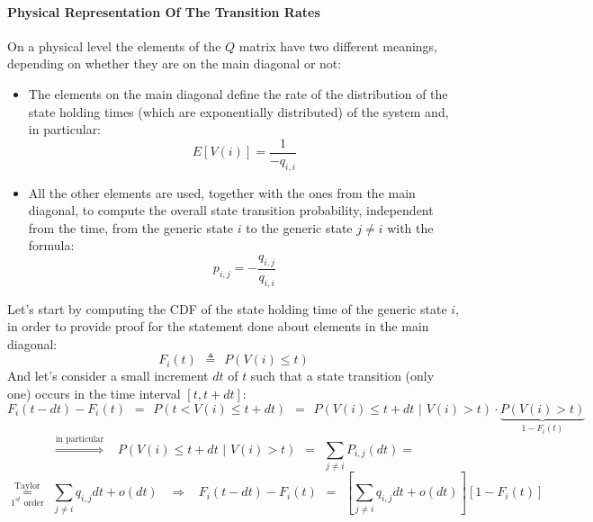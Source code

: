 \documentclass[12pt,a4paper]{article}
\begin{document}
\paragraph{Physical Representation Of The Transition Rates}
On a physical level the elements of the $Q$ matrix have two different meanings, depending on whether they are on the main diagonal or not:
\begin{itemize}
\item The elements on the main diagonal define the rate of the distribution of the state holding times (which are exponentially distributed) of the system and, in particular:
$$
E\left[V(i)\right]=\frac{1}{-q_{i,i}}
$$
\item All the other elements are used, together with the ones from the main diagonal, to compute the overall state transition probability, independent from the time, from the generic state $i$ to the generic state $j\neq i$ with the formula:
$$
p_{i,j}=-\frac{q_{i,j}}{q_{i,i}}
$$
\end{itemize}
Let's start by computing the CDF of the state holding time of the generic state $i$, in order to provide proof for the statement done about elements in the main diagonal:
$$
F_i(t)\hspace{5pt}\triangleq\hspace{5pt}
P\left( V(i)\leq t \right)
$$
And let's consider a small increment $dt$ of $t$ such that a state transition (only one) occurs in the time interval $[t,t+dt]$:
$$
F_i(t-dt)-F_i(t)\hspace{5pt}=\hspace{5pt}
P\left( t < V(i) \leq t+dt\right)\hspace{5pt}=\hspace{5pt}
P\left(V(i) \leq t+dt\hspace{4pt}|\hspace{4pt} V(i)>t \right)\cdot 
\underbrace{P\left(V(i)>t\right)}_{1-F_i(t)}
$$
$$
\overset{\textrm{in particular}}{\Rightarrow}\hspace{10pt}
P\left(V(i) \leq t+dt\hspace{4pt}|\hspace{4pt} V(i)>t \right)
\hspace{5pt}=\hspace{5pt}
\sum_{j\neq i}{P_{i,j}(dt)}
=
$$
$$
\overset{\textrm{Taylor}}{\underset{1^{st}\textrm{ order}}{=}}
\hspace{5pt}
\sum_{j\neq i}{q_{i,j}dt+o(dt)}
\hspace{10pt}
\Rightarrow
\hspace{10pt}
F_i(t-dt)-F_i(t)
\hspace{5pt}=\hspace{5pt}
\left[
\sum_{j\neq i}{q_{i,j}dt+o(dt)}
\right]
\left[
1-F_i(t)
\right]
$$ 
\end{document}
